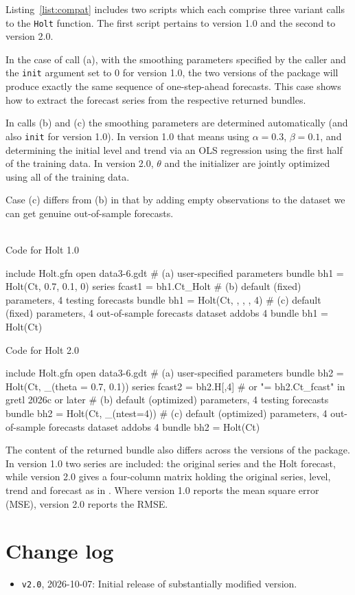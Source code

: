 \documentclass{article}
\begin{document}
Listing~\ref{list:compat} includes two scripts which each comprise three
variant calls to the \texttt{Holt} function. The first script pertains to
version 1.0 and the second to version 2.0.

In the case of call (a), with the smoothing parameters specified by the
caller and the \texttt{init} argument set to 0 for version 1.0, the two
versions of the package will produce exactly the same sequence of
one-step-ahead forecasts. This case shows how to extract the forecast
series from the respective returned bundles.

In calls (b) and (c) the smoothing parameters are determined
automatically (and also \texttt{init} for version 1.0). In version 1.0
that means using $\alpha = 0.3$, $\beta = 0.1$, and determining the
initial level and trend via an OLS regression using the first half of
the training data. In version 2.0, $\theta$ and the initializer are
jointly optimized using all of the training data.

Case (c) differs from (b) in that by adding empty observations to the
dataset we can get genuine out-of-sample forecasts.

\begin{script}[p]
  \caption{Holt 1.0 examples with corresponding 2.0 codes}
  \label{list:compat}
$\quad$ \\[1ex]
Code for Holt 1.0
\begin{scode}
include Holt.gfn
open data3-6.gdt
# (a) user-specified parameters
bundle bh1 = Holt(Ct, 0.7, 0.1, 0)
series fcast1 = bh1.Ct_Holt
# (b) default (fixed) parameters, 4 testing forecasts
bundle bh1 = Holt(Ct, , , , 4)
# (c) default (fixed) parameters, 4 out-of-sample forecasts
dataset addobs 4
bundle bh1 = Holt(Ct)
\end{scode}
Code for Holt 2.0
\begin{scode}
include Holt.gfn
open data3-6.gdt
# (a) user-specified parameters
bundle bh2 = Holt(Ct, _(theta = {0.7, 0.1}))
series fcast2 = bh2.H[,4] # or "= bh2.Ct_fcast" in gretl 2026c or later
# (b) default (optimized) parameters, 4 testing forecasts
bundle bh2 = Holt(Ct, _(ntest=4))
# (c) default (optimized) parameters, 4 out-of-sample forecasts
dataset addobs 4
bundle bh2 = Holt(Ct)
\end{scode}
\end{script}

The content of the returned bundle also differs across the versions of
the package. In version 1.0 two series are included: the original series
and the Holt forecast, while version 2.0 gives a four-column matrix
holding the original series, level, trend and forecast as in
\cite{hyndman2021}. Where version 1.0 reports the mean square error
(MSE), version 2.0 reports the RMSE.

\section{Change log}
\label{sec:log}

\begin{itemize}
\item \texttt{v2.0}, 2026-10-07: Initial release of substantially
  modified version.
\end{itemize}



\end{document}
